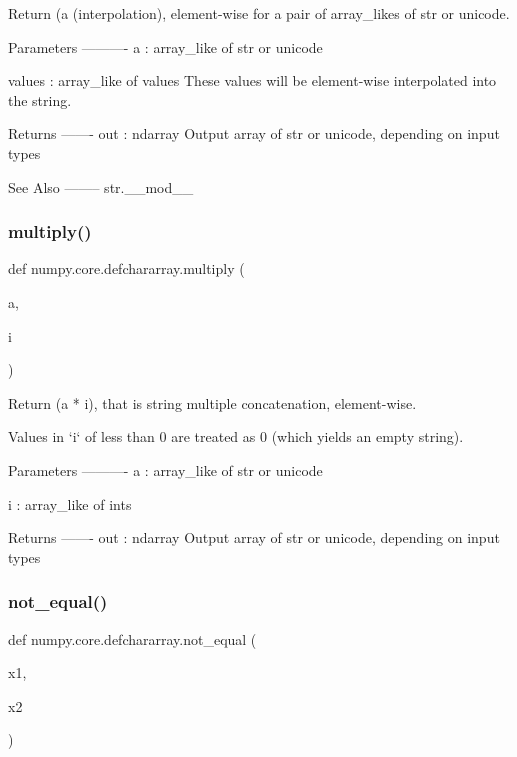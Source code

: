\begin{DoxyVerb}Return (a %
(interpolation), element-wise for a pair of array_likes of str
or unicode.

Parameters
----------
a : array_like of str or unicode

values : array_like of values
   These values will be element-wise interpolated into the string.

Returns
-------
out : ndarray
    Output array of str or unicode, depending on input types

See Also
--------
str.__mod__\end{DoxyVerb}
 \mbox{\label{namespacenumpy_1_1core_1_1defchararray_a2435cf83f23e09b4cbff427d13216da7}} 
\subsubsection{\texorpdfstring{multiply()}{multiply()}}
{\footnotesize\ttfamily def numpy.\+core.\+defchararray.\+multiply (\begin{DoxyParamCaption}\item[{}]{a,  }\item[{}]{i }\end{DoxyParamCaption})}

\begin{DoxyVerb}Return (a * i), that is string multiple concatenation,
element-wise.

Values in `i` of less than 0 are treated as 0 (which yields an
empty string).

Parameters
----------
a : array_like of str or unicode

i : array_like of ints

Returns
-------
out : ndarray
    Output array of str or unicode, depending on input types\end{DoxyVerb}
 \mbox{\label{namespacenumpy_1_1core_1_1defchararray_a57a07662e4686a064563813c2d4d1eca}} 
\subsubsection{\texorpdfstring{not\+\_\+equal()}{not\_equal()}}
{\footnotesize\ttfamily def numpy.\+core.\+defchararray.\+not\+\_\+equal (\begin{DoxyParamCaption}\item[{}]{x1,  }\item[{}]{x2 }\end{DoxyParamCaption})}

